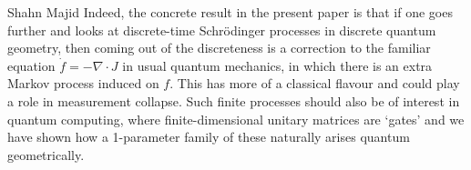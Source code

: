 \begin{artengenv}{Shahn Majid}
Indeed, the concrete result in the present paper is that if one goes further and looks at discrete-time Schr\"odinger processes in discrete quantum geometry, then coming out of the discreteness is a correction to the familiar equation $\dot f=-\nabla\cdot J$ in usual quantum mechanics, in which there is an extra Markov process induced on $f$. This has more of a classical flavour and could play a role in measurement collapse. Such finite processes should also be of interest in quantum computing, where finite-dimensional unitary matrices are `gates' and we have shown how a 1-parameter family of these naturally arises quantum geometrically. 

\end{artengenv}

 